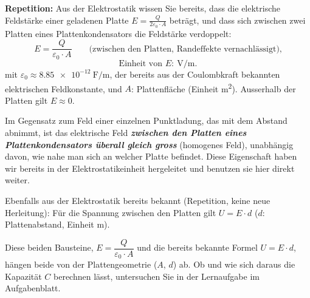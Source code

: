 \documentclass[addpoints,11pt,a4paper]{exam}
\begin{document}
\begin{theoriebox}
\textbf{Repetition:} Aus der Elektrostatik wissen Sie bereits, dass die
elektrische Feldstärke einer geladenen Platte
$E=\frac{Q}{2\varepsilon_0\cdot A}$ beträgt, und dass sich zwischen zwei
Platten eines Plattenkondensators die Feldstärke verdoppelt:
\[
  \boxed{E = \frac{Q}{\varepsilon_0\cdot A}} \qquad \text{(zwischen den Platten, Randeffekte vernachlässigt),}
\]
\[
  \text{Einheit von } E\colon\ \si{\volt\per\meter}.
\]
mit $\varepsilon_0\approx\SI{8.85e-12}{\farad\per\meter}$, der bereits aus
der Coulombkraft bekannten elektrischen Feldkonstante, und $A$:
Plattenfläche (Einheit \si{\meter\squared}). Ausserhalb der Platten gilt
$E\approx0$.

\begin{hinweisbox}
Im Gegensatz zum Feld einer einzelnen Punktladung, das mit dem Abstand
abnimmt, ist das elektrische Feld \textbf{\emph{zwischen den Platten eines
Plattenkondensators überall gleich gross}} (homogenes Feld), unabhängig
davon, wie nahe man sich an welcher Platte befindet. Diese Eigenschaft
haben wir bereits in der Elektrostatikeinheit hergeleitet und benutzen sie
hier direkt weiter.
\end{hinweisbox}

Ebenfalls aus der Elektrostatik bereits bekannt (Repetition, keine neue
Herleitung): Für die Spannung zwischen den Platten gilt $U=E\cdot d$ ($d$:
Plattenabstand, Einheit \si{\meter}).

Diese beiden Bausteine, $E=\dfrac{Q}{\varepsilon_0\cdot A}$ und die bereits
bekannte Formel $U=E\cdot d$, hängen beide von der Plattengeometrie ($A$,
$d$) ab. Ob und wie sich daraus die Kapazität $C$ berechnen lässt,
untersuchen Sie in der Lernaufgabe im Aufgabenblatt.
\end{theoriebox}
\end{document}
